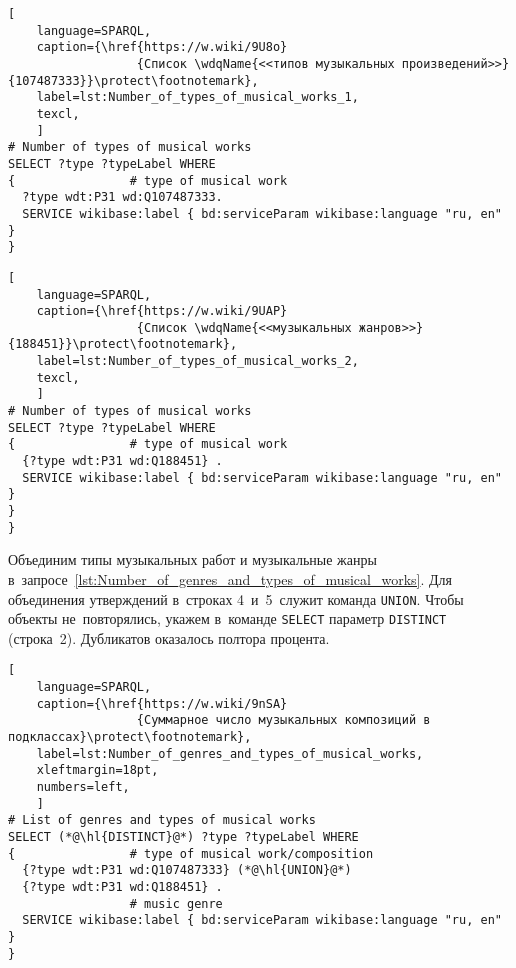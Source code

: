 \begin{lstlisting}[ 
    language=SPARQL,
    caption={\href{https://w.wiki/9U8o}
                  {Список \wdqName{<<типов музыкальных произведений>>}{107487333}}\protect\footnotemark},
    label=lst:Number_of_types_of_musical_works_1,
    texcl,
    ]
# Number of types of musical works
SELECT ?type ?typeLabel WHERE 
{                # type of musical work
  ?type wdt:P31 wd:Q107487333.      
  SERVICE wikibase:label { bd:serviceParam wikibase:language "ru, en" }
}
\end{lstlisting}%

\begin{lstlisting}[ 
    language=SPARQL,
    caption={\href{https://w.wiki/9UAP}
                  {Список \wdqName{<<музыкальных жанров>>}{188451}}\protect\footnotemark},
    label=lst:Number_of_types_of_musical_works_2,
    texcl,
    ]
# Number of types of musical works
SELECT ?type ?typeLabel WHERE 
{                # type of musical work
  {?type wdt:P31 wd:Q188451} .
  SERVICE wikibase:label { bd:serviceParam wikibase:language "ru, en" }
}
}
\end{lstlisting}%

Объединим типы музыкальных работ и музыкальные жанры 
в~запросе~\ref{lst:Number_of_genres_and_types_of_musical_works}. 
Для объединения утверждений в~строках 4~и~5~служит команда \lstinline|UNION|. 
Чтобы объекты не~повторялись, 
укажем в~команде \lstinline|SELECT| параметр \lstinline|DISTINCT| (строка~2). 
Дубликатов оказалось полтора процента. 

\begin{lstlisting}[ 
    language=SPARQL,
    caption={\href{https://w.wiki/9nSA}
                  {Суммарное число музыкальных композиций в подклассах}\protect\footnotemark},
    label=lst:Number_of_genres_and_types_of_musical_works,
    xleftmargin=18pt,
    numbers=left,
    ]
# List of genres and types of musical works
SELECT (*@\hl{DISTINCT}@*) ?type ?typeLabel WHERE 
{                # type of musical work/composition
  {?type wdt:P31 wd:Q107487333} (*@\hl{UNION}@*)
  {?type wdt:P31 wd:Q188451} .
                 # music genre
  SERVICE wikibase:label { bd:serviceParam wikibase:language "ru, en" }
}
\end{lstlisting}%

